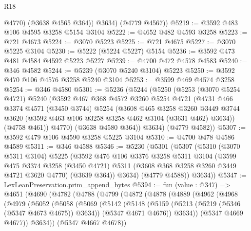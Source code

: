 \begin{lexlean}{R18}
\begin{coremodule}
            @4770)
          (@3638 @4565 @364))
        @3634)
      (@4779 @4567))
@5219 := @3592 @483 @106 @4595 @3258 @5154 @3104
@5222 := @4652 @482 @4593 @3258
@5223 := @721 @4673
@5224 := @3070 @5223
@5225 := @721 @4675
@5227 := @3070 @5225 @3104
@5230 := @5222 (@5224 @5227) @5154
@5236 := @3592 @473 @481 @4584 @4592 @5223 @5227
@5239 := @4700 @472 @4578 @4583
@5240 := @346 @4582
@5244 := @5239 (@3070 @5240 @3104) @5223
@5250 := @3592 @470 @106 @4576 @3258 @5240 @3104
@5253 := @3599 @469 @4574 @3258
@5254 := @346 @4580
@5301 := @5236
    (@5244
      (@5250
        (@5253
          (@3070 @5254 @4721)
          @5240
          (@3592
            @467
            @368
            @4572
            @3260
            @5254
            @4721
            (@4731
              @466
              @3374
              @4571
              (@3450 @3744)
              @5254
              (@3608
                @465
                @3258
                @3260
                @3449
                @3744
                @3620
                (@3592 @463 @106 @3258 @3258 @462 @3104 (@3631 @462) @3634))
              (@4758 @461))
            @4770)
          (@3638 @4580 @364))
        @3634)
      (@4779 @4582))
@5307 := @3592 @479 @106 @4590 @3258 @5225 @3104
@5310 := @4700 @478 @4586 @4589
@5311 := @346 @4588
@5346 := @5230
    (@5301
      (@5307
        (@5310
          (@3070 @5311 @3104)
          @5225
          (@3592
            @476
            @106
            @3376
            @3258
            @5311
            @3104
            (@3599
              @475
              @3374
              @3258
              (@3450 @4721)
              @5311
              (@3608 @368 @3258 @3260 @3449 @4721 @3620 @4770)
              (@3639 @364))
            @3634)
          (@4779 @4588))
        @3634))
@5347 := LexLeanPreservation.prim_append_bytes
@5394 := fun (value : @347) =>
  @4651
    (@4690
      (@4782
        (@4788
          (@4799
            (@4872
              (@4878
                (@4889
                  (@4962
                    (@4968
                      (@4979
                        (@5052
                          (@5058
                            (@5069
                              (@5142
                                (@5148
                                  (@5159
                                    (@5213 (@5219 (@5346 (@5347 @4673 @4675)) @3634))
                                    (@5347 @4671 @4676))
                                  @3634))
                              (@5347 @4669 @4677))
                            @3634))
                        (@5347 @4667 @4678))

\end{coremodule}
\end{lexlean}
